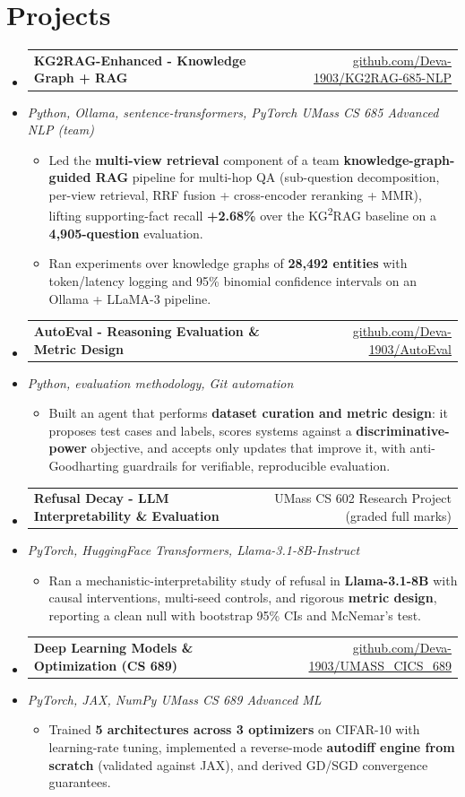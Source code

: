 \documentclass[letterpaper,10pt]{article}
\makeatletter
\newcommand{\resumeItem}[1]{
  \item\small{#1\vspace{-1pt}}
}
\newcommand{\resumeProjectHeading}[2]{
    \item
    \begin{tabular*}{0.985\textwidth}[t]{l@{\extracolsep{\fill}}r}
      \small\textbf{#1} & \small #2 \\
    \end{tabular*}\vspace{-5pt}
}
\newcommand{\resumeProjectSubheading}[1]{
  \vspace{-2pt}\item[] {\small\textcolor{ResumeSlate}{\emph{#1}}}\vspace{-3pt}
}
\newcommand{\resumeSubHeadingListStart}{\begin{itemize}[leftmargin=0.0in, label={}, itemsep=2pt, topsep=2pt]}
\newcommand{\resumeSubHeadingListEnd}{\end{itemize}}
\newcommand{\resumeItemListStart}{\begin{itemize}[leftmargin=0.18in, itemsep=2pt, topsep=1pt]}
\newcommand{\resumeItemListEnd}{\end{itemize}\vspace{-4pt}}
\makeatother
\begin{document}
\section{Projects}
\resumeSubHeadingListStart
  \resumeProjectHeading
    {KG2RAG-Enhanced - Knowledge Graph + RAG}
    {\href{https://github.com/Deva-1903/KG2RAG-685-NLP}{github.com/Deva-1903/KG2RAG-685-NLP}}
  \resumeProjectSubheading{Python, Ollama, sentence-transformers, PyTorch \enspace\textbar\enspace UMass CS 685 Advanced NLP (team)}
    \resumeItemListStart
      \resumeItem{Led the \textbf{multi-view retrieval} component of a team \textbf{knowledge-graph-guided RAG} pipeline for multi-hop QA (sub-question decomposition, per-view retrieval, RRF fusion + cross-encoder reranking + MMR), lifting supporting-fact recall \textbf{+2.68\%} over the KG\textsuperscript{2}RAG baseline on a \textbf{4,905-question} evaluation.}
      \resumeItem{Ran experiments over knowledge graphs of \textbf{28,492 entities} with token/latency logging and 95\% binomial confidence intervals on an Ollama + LLaMA-3 pipeline.}
    \resumeItemListEnd
  \resumeProjectHeading
    {AutoEval - Reasoning Evaluation \& Metric Design}
    {\href{https://github.com/Deva-1903/AutoEval}{github.com/Deva-1903/AutoEval}}
  \resumeProjectSubheading{Python, evaluation methodology, Git automation}
    \resumeItemListStart
      \resumeItem{Built an agent that performs \textbf{dataset curation and metric design}: it proposes test cases and labels, scores systems against a \textbf{discriminative-power} objective, and accepts only updates that improve it, with anti-Goodharting guardrails for verifiable, reproducible evaluation.}
    \resumeItemListEnd
  \resumeProjectHeading
    {Refusal Decay - LLM Interpretability \& Evaluation}
    {UMass CS 602 Research Project (graded full marks)}
  \resumeProjectSubheading{PyTorch, HuggingFace Transformers, Llama-3.1-8B-Instruct}
    \resumeItemListStart
      \resumeItem{Ran a mechanistic-interpretability study of refusal in \textbf{Llama-3.1-8B} with causal interventions, multi-seed controls, and rigorous \textbf{metric design}, reporting a clean null with bootstrap 95\% CIs and McNemar's test.}
    \resumeItemListEnd
  \resumeProjectHeading
    {Deep Learning Models \& Optimization (CS 689)}
    {\href{https://github.com/Deva-1903/UMASS_CICS_689}{github.com/Deva-1903/UMASS\_CICS\_689}}
  \resumeProjectSubheading{PyTorch, JAX, NumPy \enspace\textbar\enspace UMass CS 689 Advanced ML}
    \resumeItemListStart
      \resumeItem{Trained \textbf{5 architectures across 3 optimizers} on CIFAR-10 with learning-rate tuning, implemented a reverse-mode \textbf{autodiff engine from scratch} (validated against JAX), and derived GD/SGD convergence guarantees.}
    \resumeItemListEnd
\resumeSubHeadingListEnd
\vspace{-4pt}
\end{document}
